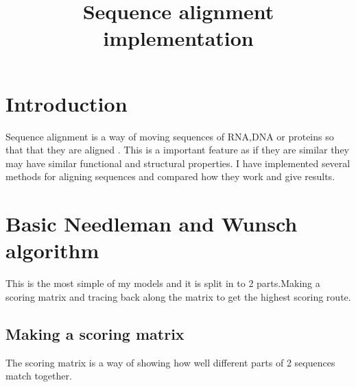 \documentclass{cmppgr}
\title{Sequence alignment implementation}
\begin{document}
	\maketitle
	
	
	\section{Introduction}
	
	Sequence alignment is a way of moving sequences of RNA,DNA or proteins so that that they are aligned . This is a important feature as if they are similar they may have similar functional and structural properties. I have implemented several methods for aligning sequences and compared how they work and give results.
	
	\section{Basic Needleman and Wunsch algorithm}
	This is the most simple of my models and it is split in to 2 parts.Making a scoring matrix and tracing back along the matrix to get the highest scoring route.
	
	\subsection{Making a scoring matrix}
	
	The scoring matrix is a way of showing how well different parts of 2 sequences match together. 
	
\end{document}
